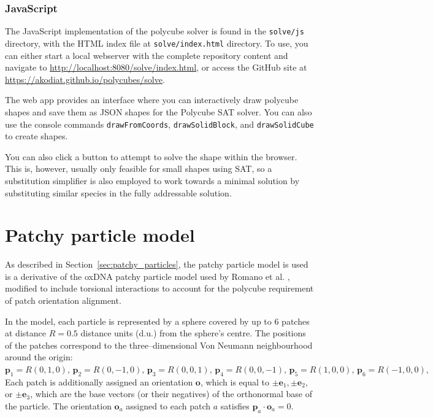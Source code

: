 \subsection{JavaScript}
 The JavaScript implementation of the polycube solver is found in the \texttt{solve/js} directory, with the  HTML index file at \texttt{solve/index.html} directory. To use, you can either start a local webserver with the complete repository content and navigate to \url{http://localhost:8080/solve/index.html}, or access the GitHub site at \url{https://akodiat.github.io/polycubes/solve}.

 The web app provides an interface where you can interactively draw polycube shapes and save them as JSON shapes for the Polycube SAT solver. You can also use the console commands \texttt{drawFromCoords}, \texttt{drawSolidBlock}, and \texttt{drawSolidCube} to create shapes.

 You can also click a button to attempt to solve the shape within the browser. This is, however, usually only feasible for small shapes using SAT, so a substitution simplifier is also employed to work towards a minimal solution by substituting similar species in the fully addressable solution.


\chapter{Patchy particle model}
\label{ch:appendix_patchy}
As described in Section~\ref{sec:patchy_particles}, the patchy particle model is used is a derivative of the oxDNA patchy particle model used by Romano et al. \cite{rovigatti2015comparison}, modified to include torsional interactions to account for the polycube requirement of patch orientation alignment.

In the model, each particle is represented by a sphere covered by up to 6 patches at distance $R = 0.5$ distance units (d.u.) from the sphere's centre. The positions of the patches correspond to the three--dimensional Von Neumann neighbourhood around the origin:
$
 \mathbf{p}_1 = R \left( 0,1,0\right),\, \mathbf{p}_2 = R \left( 0,-1,0 \right),\,   %
 \mathbf{p}_3 = R \left( 0,0,1 \right),\, \mathbf{p}_4 = R \left(  0, 0, -1 \right),\, %
 \mathbf{p}_5 = R \left( 1,0,0 \right),\, \mathbf{p}_6 = R \left( -1, 0, 0 \right),
$
Each patch is additionally assigned an orientation $\mathbf{o}$, which is equal to
$\pm \mathbf{e}_1, \pm \mathbf{e}_2$, or $\pm \mathbf{e}_3$, which are the base vectors (or their negatives) of the orthonormal base of the particle. The orientation  $\mathbf{o}_a$ assigned to each patch $a$ satisfies $\mathbf{p}_a \cdot \mathbf{o}_a = 0$.

